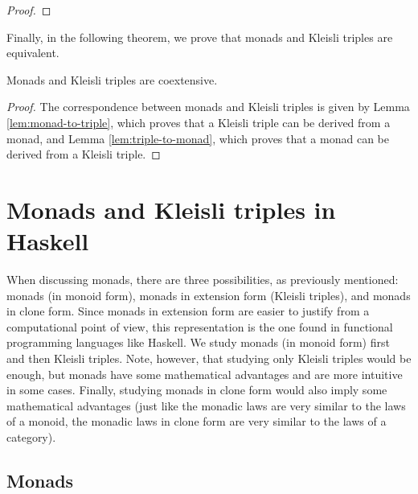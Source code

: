 \begin{lemma}
\begin{proof}
  \end{proof}

\end{lemma}

Finally, in the following theorem, we prove that monads and Kleisli
triples are equivalent.

\begin{theorem}
  \label{the:monad-triple}

  Monads and Kleisli triples are coextensive.

  \begin{proof}

    The correspondence between monads and Kleisli triples is given by
    Lemma \ref{lem:monad-to-triple}, which proves that a Kleisli
    triple can be derived from a monad, and Lemma
    \ref{lem:triple-to-monad}, which proves that a monad can be
    derived from a Kleisli triple.

  \end{proof}

\end{theorem}

\section{Monads and Kleisli triples in Haskell}
\label{sec:monads-haskell}

When discussing monads, there are three possibilities, as previously
mentioned: monads (in monoid form), monads in extension form (Kleisli
triples), and monads in clone form. Since monads in extension form are
easier to justify from a computational point of view, this
representation is the one found in functional programming languages
like Haskell. We study monads (in monoid form) first and then Kleisli
triples. Note, however, that studying only Kleisli triples would be
enough, but monads have some mathematical advantages and are more
intuitive in some cases. Finally, studying monads in clone form would
also imply some mathematical advantages (just like the monadic laws
are very similar to the laws of a monoid, the monadic laws in clone
form are very similar to the laws of a category).

\subsection*{Monads}

